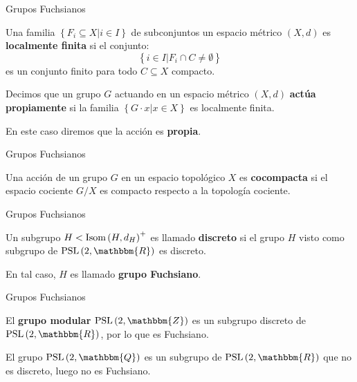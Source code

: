 \documentclass[xcolor=dvipsnames]{beamer}
\theoremstyle{largebreak}
\newcommand{\bbm}[1]{\ensuremath{\mathbbm{#1}}}
\newcommand{\Isom}[1]{\ensuremath{\textup{Isom}\left(#1\right)}}
\newcommand{\PSL}[1]{\ensuremath{\textup{PSL}\left(#1\right)}}
\begin{document}
\begin{frame}{Grupos Fuchsianos}
    \begin{mydef}
        Una familia $\left\{F_i\subseteq X\Big|i\in I \right\}$ de subconjuntos un espacio métrico $(X,d)$ es \textbf{localmente finita} si el conjunto:
        \begin{equation*}
            \left\{i\in I \Big|F_i\cap C\neq\emptyset \right\}
        \end{equation*}
        es un conjunto finito para todo $C\subseteq X$ compacto.
    \end{mydef}

    \begin{mydef}
        Decimos que un grupo $G$ actuando en un espacio métrico $(X,d)$ \textbf{actúa propiamente} si la familia $\left\{G\cdot x\Big|x\in X \right\}$ es localmente finita.

        En este caso diremos que la acción es \textbf{propia}.
    \end{mydef}
\end{frame}

\begin{frame}{Grupos Fuchsianos}
    \begin{mydef}
        Una acción de un grupo $G$ en un espacio topológico $X$ es \textbf{cocompacta} si el espacio cociente $G/X$ es compacto respecto a la topología cociente.
    \end{mydef}
\end{frame}

\begin{frame}{Grupos Fuchsianos}
    \begin{mydef}
        Un subgrupo $H<\Isom{H,d_H}^+$ es llamado \textbf{discreto} si el grupo $H$ visto como subgrupo de $\PSL{2,\bbm{R}}$ es discreto.
        
        En tal caso, $H$ es llamado \textbf{grupo Fuchsiano}.
    \end{mydef}
\end{frame}

\begin{frame}{Grupos Fuchsianos}
    \begin{exa}
        El \textbf{grupo modular} $\PSL{2,\bbm{Z}}$ es un subgrupo discreto de $\PSL{2,\bbm{R}}$, por lo que es Fuchsiano.
    \end{exa}

    \begin{exa}
        El grupo $\PSL{2,\bbm{Q}}$ es un subgrupo de $\PSL{2,\bbm{R}}$ que no es discreto, luego no es Fuchsiano.
    \end{exa}
\end{frame}
\end{document}
